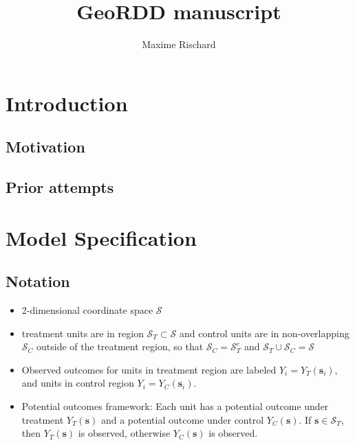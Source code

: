 \documentclass[letter]{article}
\title{GeoRDD manuscript}
\author{Maxime Rischard}
\providecommand{\tightlist}{%
      \setlength{\itemsep}{0pt}\setlength{\parskip}{0pt}}
\newcommand{\scrS}{\mathscr{S}}
\newcommand{\svec}{\mathbold{s}}
\providecommand{\tightlist}{%
  	  \setlength{\itemsep}{0pt}\setlength{\parskip}{0pt}}
\begin{document}
    
    
    
    \maketitle
    
    
	\tableofcontents


    





    	\section{Introduction}\label{introduction}

\subsection{Motivation}\label{motivation}

\subsection{Prior attempts}\label{prior-attempts}
    


    	\section{Model Specification}\label{model-specification}

\subsection{Notation}\label{notation}

\begin{itemize}
\tightlist
\item
  2-dimensional coordinate space \(\scrS\)
\item
  treatment units are in region \(\scrS_T \subset \scrS\) and control
  units are in non-overlapping \(\scrS_C\) outside of the treatment
  region, so that \(\scrS_C = \scrS_T^c\) and
  \(\scrS_T \cup \scrS_C = \scrS\)
\item
  Observed outcomes for units in treatment region are labeled
  \(Y_i = Y_T(\svec_i)\), and units in control region
  \(Y_i = Y_C(\svec_i)\).
\item
  Potential outcomes framework: Each unit has a potential outcome under
  treatment \(Y_T(\svec)\) and a potential outcome under control
  \(Y_C(\svec)\). If \(\svec \in \scrS_T\), then \(Y_T(\svec)\) is
  observed, otherwise \(Y_C(\svec)\) is observed.
\end{itemize}
\end{document}
